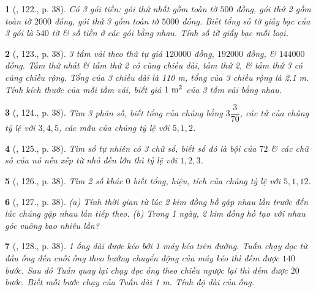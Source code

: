 \documentclass{article}
\newtheorem{baitoan}{}
\begin{document}
\begin{baitoan}[\cite{Binh_Toan_7_tap_1}, 122., p. 38]
	Có 3 gói tiền: gói thứ nhất gồm toàn tờ $500$ đồng, gói thứ 2 gồm toàn tờ $2000$ đồng, gói thứ 3 gồm toàn tờ $5000$ đồng. Biết tổng số tờ giấy bạc của 3 gói là $540$ tờ \& số tiền ở các gói bằng nhau. Tính số tờ giấy bạc mỗi loại.
\end{baitoan}

\begin{baitoan}[\cite{Binh_Toan_7_tap_1}, 123., p. 38]
	3 tấm vải theo thứ tự giá $120000$ đồng, $192000$ đồng, \& $144000$ đồng. Tấm thứ nhất \& tấm thứ 2 có cùng chiều dài, tấm thứ 2, \& tấm thứ 3 có cùng chiều rộng. Tổng của 3 chiều dài là {\rm110 m}, tổng của 3 chiều rộng là {\rm2.1 m}. Tính kích thước của mỗi tấm vải, biết giá $\rm1\ m^2$ của 3 tấm vải bằng nhau.
\end{baitoan}

\begin{baitoan}[\cite{Binh_Toan_7_tap_1}, 124., p. 38]
	Tìm 3 phân số, biết tổng của chúng bằng $3\dfrac{3}{70}$, các tử của chúng tỷ lệ với $3,4,5$, các mẫu của chúng tỷ lệ với $5,1,2$.
\end{baitoan}

\begin{baitoan}[\cite{Binh_Toan_7_tap_1}, 125., p. 38]
	Tìm số tự nhiên có 3 chữ số, biết số đó là bội của $72$ \& các chữ số của nó nếu xếp từ nhỏ đến lớn thì tỷ lệ với $1,2,3$.
\end{baitoan}

\begin{baitoan}[\cite{Binh_Toan_7_tap_1}, 126., p. 38]
	Tìm 2 số khác $0$ biết tổng, hiệu, tích của chúng tỷ lệ với $5,1,12$.
\end{baitoan}

\begin{baitoan}[\cite{Binh_Toan_7_tap_1}, 127., p. 38]
	(a) Tính thời gian từ lúc 2 kim đồng hồ gặp nhau lần trước đến lúc chúng gặp nhau lần tiếp theo. (b) Trong 1 ngày, 2 kim đồng hồ tạo với nhau góc vuông bao nhiêu lần?	
\end{baitoan}

\begin{baitoan}[\cite{Binh_Toan_7_tap_1}, 128., p. 38]
	1 ống dài được kéo bởi 1 máy kéo trên đường. Tuấn chạy dọc từ đầu ống đến cuối ống theo hướng chuyển động của máy kéo thì đếm được $140$ bước. Sau đó Tuấn quay lại chạy dọc ống theo chiều ngược lại thì đếm được $20$ bước. Biết mỗi bước chạy của Tuấn dài {\rm1 m}. Tính độ dài của ống.
\end{baitoan}
\end{document}
